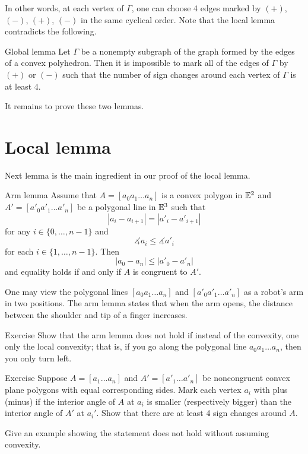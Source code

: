 In other words, at each vertex of $\Gamma$, one can choose 4 edges marked by $(+)$, $(-)$, $(+)$, $(-)$ in the same cyclical order.
Note that the local lemma contradicts the following.

\begin{thm}{Global lemma}\label{lem:global}
Let $\Gamma$ be a nonempty subgraph of the graph formed by the edges of a convex polyhedron. Then it is impossible to mark all of the edges of $\Gamma$ by $(+)$ or $(-)$ 
such that the number of sign changes around each vertex of $\Gamma$ is at least $4$.
\end{thm}

It remains to prove these two lemmas.
\qeds


\section{Local lemma}

Next lemma is the main ingredient in our proof of the local lemma.

\begin{thm}{Arm lemma}\label{lem:arm}
Assume that $A=[a_0 a_1\dots a_n]$ is a convex polygon in $\mathbb{E}^2$
and $A'=[a'_0 a'_1\dots a'_n]$ be a polygonal line in $\mathbb{E}^3$
such that 
$$|a_i-a_{i+1}|=|a'_i-a'_{i+1}|$$ for any $i\in\{0,\dots,n-1\}$
and 
$$\measuredangle a_i\le \measuredangle a'_i$$ 
for each $i\in\{1,\dots,n-1\}$.
Then 
$$|a_0-a_n|\le |a'_0-a'_n|$$
and equality holds if and only if $A$ is congruent to $A'$.
\end{thm}

One may view the polygonal lines $[a_0a_1\dots a_n]$ and $[a'_0a'_1\dots a'_n]$ as a robot's arm in two positions.
The arm lemma states that when the arm opens, 
the distance between the shoulder and tip of a finger increases. 

\begin{thm}{Exercise}\label{ex:arm-nonconvex}
Show that the arm lemma does not hold if 
instead of the convexity,
one only the local convexity;
that is, if you go along the polygonal line $a_0 a_1\dots a_n$, then you only turn left.
\end{thm}

\begin{thm}{Exercise}\label{ex:cauchy}
Suppose $A=[a_1\dots a_n]$ and $A'=[a'_1\dots a'_n]$ be noncongruent convex plane polygons with equal corresponding sides.
Mark each vertex $a_i$ with plus (minus) if the interior angle of $A$ at $a_i$ is smaller (respectively bigger) than the interior angle of $A'$ at $a_i'$.
Show that there are at least 4 sign changes around $A$. %

Give an example showing the statement does not hold without assuming convexity.

\end{thm}

